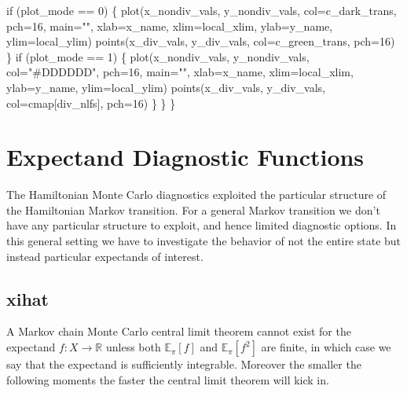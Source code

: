 \documentclass[
  letterpaper,
  DIV=11,
  numbers=noendperiod]{scrartcl}
\newenvironment{Shaded}{\begin{snugshade}}{\end{snugshade}}
\newcommand{\ControlFlowTok}[1]{\textcolor[rgb]{0.00,0.23,0.31}{#1}}
\newcommand{\DecValTok}[1]{\textcolor[rgb]{0.68,0.00,0.00}{#1}}
\newcommand{\NormalTok}[1]{\textcolor[rgb]{0.00,0.23,0.31}{#1}}
\newcommand{\OperatorTok}[1]{\textcolor[rgb]{0.37,0.37,0.37}{#1}}
\newcommand{\StringTok}[1]{\textcolor[rgb]{0.13,0.47,0.30}{#1}}
\begin{document}
\begin{Shaded}
\begin{Highlighting}[]
    \ControlFlowTok{if}\NormalTok{ (plot\_mode }\OperatorTok{==} \DecValTok{0}\NormalTok{) \{}
\NormalTok{      plot(x\_nondiv\_vals, y\_nondiv\_vals,}
\NormalTok{           col}\OperatorTok{=}\NormalTok{c\_dark\_trans, pch}\OperatorTok{=}\DecValTok{16}\NormalTok{, main}\OperatorTok{=}\StringTok{""}\NormalTok{,}
\NormalTok{           xlab}\OperatorTok{=}\NormalTok{x\_name, xlim}\OperatorTok{=}\NormalTok{local\_xlim, }
\NormalTok{           ylab}\OperatorTok{=}\NormalTok{y\_name, ylim}\OperatorTok{=}\NormalTok{local\_ylim)}
\NormalTok{      points(x\_div\_vals, y\_div\_vals,}
\NormalTok{             col}\OperatorTok{=}\NormalTok{c\_green\_trans, pch}\OperatorTok{=}\DecValTok{16}\NormalTok{)}
\NormalTok{    \}}
    \ControlFlowTok{if}\NormalTok{ (plot\_mode }\OperatorTok{==} \DecValTok{1}\NormalTok{) \{}
\NormalTok{      plot(x\_nondiv\_vals, y\_nondiv\_vals,}
\NormalTok{           col}\OperatorTok{=}\StringTok{"\#DDDDDD"}\NormalTok{, pch}\OperatorTok{=}\DecValTok{16}\NormalTok{, main}\OperatorTok{=}\StringTok{""}\NormalTok{,}
\NormalTok{           xlab}\OperatorTok{=}\NormalTok{x\_name, xlim}\OperatorTok{=}\NormalTok{local\_xlim, }
\NormalTok{           ylab}\OperatorTok{=}\NormalTok{y\_name, ylim}\OperatorTok{=}\NormalTok{local\_ylim)}
\NormalTok{      points(x\_div\_vals, y\_div\_vals,}
\NormalTok{             col}\OperatorTok{=}\NormalTok{cmap[div\_nlfs], pch}\OperatorTok{=}\DecValTok{16}\NormalTok{)}
\NormalTok{    \}}
\NormalTok{  \}}
\NormalTok{\}}
\end{Highlighting}
\end{Shaded}

\section{Expectand Diagnostic
Functions}\label{expectand-diagnostic-functions}

The Hamiltonian Monte Carlo diagnostics exploited the particular
structure of the Hamiltonian Markov transition. For a general Markov
transition we don't have any particular structure to exploit, and hence
limited diagnostic options. In this general setting we have to
investigate the behavior of not the entire state but instead particular
expectands of interest.

\subsection{xihat}\label{xihat}

A Markov chain Monte Carlo central limit theorem cannot exist for the
expectand \(f : X \rightarrow \mathbb{R}\) unless both
\(\mathbb{E}_{\pi}[f]\) and \(\mathbb{E}_{\pi}[f^{2}]\) are finite, in
which case we say that the expectand is sufficiently integrable.
Moreover the smaller the following moments the faster the central limit
theorem will kick in.
\end{document}

